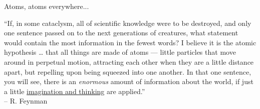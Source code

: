 \begin{frame}[fragile]{Atoms, atoms everywhere...}

    ``If, in some cataclysm, all of scientific knowledge were to be destroyed, and only one sentence passed on to the next generations of creatures, what statement would contain the most information in the fewest words? I believe it is the atomic hypothesis … that all things are made of atoms — little particles that move around in perpetual motion, attracting each other when they are a little distance apart, but repelling upon being squeezed into one another. In that one sentence, you will see, there is an {\em enormous} amount of information about the world, if just a little \ul{imagination and thinking} are applied.''\\
    -- R. Feynman


\end{frame}
